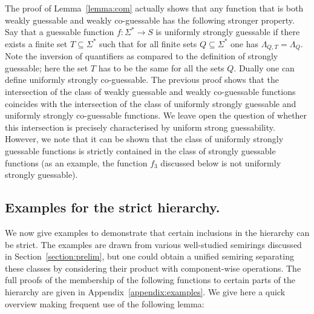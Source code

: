 \documentclass{lmcs}
\numberwithin{theorem}{section}
\begin{document}
\begin{rem}
\label{rk:universalsg}
The proof of Lemma~\ref{lemma:com} actually shows that any function that is both weakly guessable and weakly co-guessable has the following stronger property. Say that a guessable function $f: \Sigma^* \rightarrow S$ is uniformly strongly guessable if there exists a finite set $T \subseteq \Sigma^*$ such that for all finite sets $Q \subseteq \Sigma^*$ one has $\Lambda_{Q,T} = \Lambda_{Q}$. Note the inversion of quantifiers as compared to the definition of strongly guessable; here the set $T$ has to be the same for all the sets $Q$. Dually one can define uniformly strongly co-guessable. The previous proof shows that the intersection of the class of weakly guessable and weakly co-guessable functions coincides with the intersection of the class of uniformly strongly guessable and uniformly strongly co-guessable functions.  We leave open the question of whether this intersection  is precisely characterised by uniform strong guessability. However, we note that it can be shown that the class of uniformly strongly guessable functions is strictly contained in the class of strongly guessable functions (as an example, the function $f_3$ discussed below is not uniformly strongly guessable).
\end{rem}

\subsection{Examples for the strict hierarchy.}
\label{subsec:strict}

We now give examples to demonstrate that certain inclusions in the hierarchy can be strict. The examples are drawn from various well-studied semirings discussed in Section~\ref{section:prelim}, but one could obtain a unified semiring separating these classes by considering their product with component-wise operations.  The full proofs of the membership of the following functions to certain parts of the hierarchy are given in Appendix~\ref{appendix:examples}. We give here a quick overview making frequent use of the following lemma:
\end{document}
